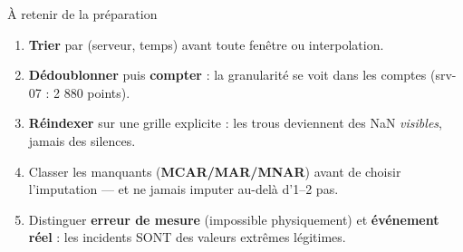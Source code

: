 \begin{frame}{À retenir de la préparation}
\begin{kbox}
\begin{enumerate}
\item \textbf{Trier} par (serveur, temps) avant toute fenêtre ou interpolation.
\item \textbf{Dédoublonner} puis \textbf{compter} : la granularité se voit
dans les comptes (srv-07 : 2 880 points).
\item \textbf{Réindexer} sur une grille explicite : les trous deviennent
des NaN \emph{visibles}, jamais des silences.
\item Classer les manquants (\textbf{MCAR/MAR/MNAR}) avant de choisir
l'imputation --- et ne jamais imputer au-delà d'1--2 pas.
\item Distinguer \textbf{erreur de mesure} (impossible physiquement)
et \textbf{événement réel} : les incidents SONT des valeurs extrêmes légitimes.
\end{enumerate}
\end{kbox}
\end{frame}
